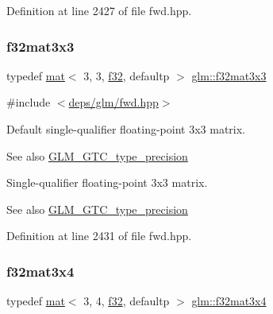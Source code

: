 Definition at line 2427 of file fwd.\+hpp.

\mbox{\label{group__gtc__type__precision_ga177c076d6d9aea27a5ae87b52607e57a}} 
\subsubsection{\texorpdfstring{f32mat3x3}{f32mat3x3}}
{\footnotesize\ttfamily typedef \hyperlink{structglm_1_1mat}{mat}$<$ 3, 3, \hyperlink{group__gtc__type__precision_ga0ec999b57f5330d9021256e96038df04}{f32}, defaultp $>$ \hyperlink{group__gtc__type__precision_ga177c076d6d9aea27a5ae87b52607e57a}{glm\+::f32mat3x3}}



{\ttfamily \#include $<$\hyperlink{fwd_8hpp}{deps/glm/fwd.\+hpp}$>$}

Default single-\/qualifier floating-\/point 3x3 matrix. \begin{DoxySeeAlso}{See also}
\hyperlink{group__gtc__type__precision}{G\+L\+M\+\_\+\+G\+T\+C\+\_\+type\+\_\+precision}
\end{DoxySeeAlso}
Single-\/qualifier floating-\/point 3x3 matrix. \begin{DoxySeeAlso}{See also}
\hyperlink{group__gtc__type__precision}{G\+L\+M\+\_\+\+G\+T\+C\+\_\+type\+\_\+precision} 
\end{DoxySeeAlso}


Definition at line 2431 of file fwd.\+hpp.

\mbox{\label{group__gtc__type__precision_ga8459d79e94eb107e31f0ee600e9bae3f}} 
\subsubsection{\texorpdfstring{f32mat3x4}{f32mat3x4}}
{\footnotesize\ttfamily typedef \hyperlink{structglm_1_1mat}{mat}$<$ 3, 4, \hyperlink{group__gtc__type__precision_ga0ec999b57f5330d9021256e96038df04}{f32}, defaultp $>$ \hyperlink{group__gtc__type__precision_ga8459d79e94eb107e31f0ee600e9bae3f}{glm\+::f32mat3x4}}



